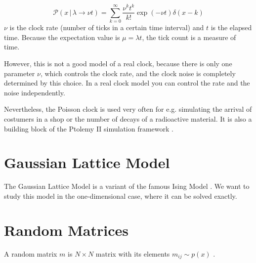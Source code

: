 \documentclass{tstextbook}
\begin{document}
\begin{definition}
  \label{th:poissonclock}
  \begin{equation}
    \mathcal{P}(x\,\vert\, \lambda\rightarrow\nu t)=\sum_{k=0}^{\infty}\frac{\nu^k t^k}{k!}\exp(-\nu t)\delta(x-k)
  \end{equation}
  $\nu$ is the clock rate (number of ticks in a certain time interval) and $t$ is the elapsed time. Because the expectation value is $\mu=\lambda t$, the tick count is a measure of time.
\end{definition}
However, this is not a good model of a real clock, because there is only one parameter $\nu$, which controls the clock rate, and the clock noise is completely determined by this choice. In a real clock model you can control the rate and the noise independently.

Nevertheless, the Poisson clock is used very often for e.g. simulating the arrival of costumers in a shop or the number of decays of a radioactive material. It is also a building block of the Ptolemy II simulation framework \cite{ptolemy2003}. 
\section{Gaussian Lattice Model}
The Gaussian Lattice Model is a variant of the famous Ising Model \cite{mussardo2010}. We want to study this model in the one-dimensional case, where it can be solved exactly.

\section{Random Matrices}
A random matrix $m$ is $N\times N$ matrix with its elements $m_{ij}\sim p(x)$ \cite{livan2017}.


\printbibliography{}


\printindex
\end{document}
